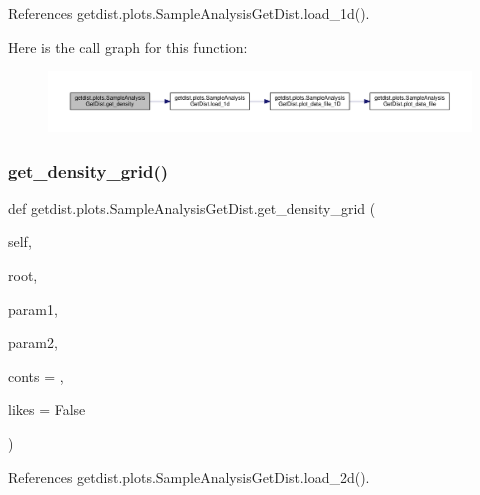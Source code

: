 References getdist.\+plots.\+Sample\+Analysis\+Get\+Dist.\+load\+\_\+1d().

Here is the call graph for this function\+:
\nopagebreak
\begin{figure}[H]
\begin{center}
\leavevmode
\includegraphics[width=350pt]{classgetdist_1_1plots_1_1SampleAnalysisGetDist_a0d7a9bedcc6b45701298597a18ce3d9e_cgraph}
\end{center}
\end{figure}
\mbox{\label{classgetdist_1_1plots_1_1SampleAnalysisGetDist_a0dd526731ad07af55ecee518231c7a28}} 
\subsubsection{\texorpdfstring{get\+\_\+density\+\_\+grid()}{get\_density\_grid()}}
{\footnotesize\ttfamily def getdist.\+plots.\+Sample\+Analysis\+Get\+Dist.\+get\+\_\+density\+\_\+grid (\begin{DoxyParamCaption}\item[{}]{self,  }\item[{}]{root,  }\item[{}]{param1,  }\item[{}]{param2,  }\item[{}]{conts = {},  }\item[{}]{likes = {\ttfamily False} }\end{DoxyParamCaption})}



References getdist.\+plots.\+Sample\+Analysis\+Get\+Dist.\+load\+\_\+2d().


